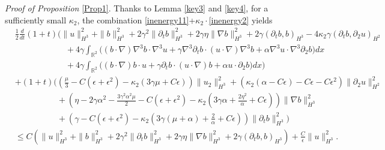 \documentclass[reqno,11pt]{amsart}
\def\R{\mathbb R}
\numberwithin{Thm}{section}
\begin{document}
 \textit{Proof of Proposition} \ref{Prop1}. Thanks to Lemma \ref{key3} and \ref{key4}, for a sufficiently small $\kappa_2$, the combination \eqref{inenergy11}+$\kappa_2\cdot$\eqref{inenergy2} yields
\begin{align*}
&\frac{1}{2}\frac{d}{dt}(1+t)\Big(\|u\|^2_{H^3}+\| b\|^2_{H^3}+2\gamma^2\|\partial_tb\|^2_{H^3}
+2\gamma\eta\|\nabla b\|^2_{H^3}+2\gamma(\partial_tb,b)_{H^3}-4\kappa_2\gamma(\partial_tb,\partial_2u)_{H^2}\nonumber\\
&\qquad\quad\qquad\quad+4\gamma\int_{\R^2}\big((b\cdot\nabla)\nabla^3 b\cdot\nabla^3 u+\gamma\nabla^3\partial_{t}b\cdot (u\cdot\nabla)\nabla^3 b+\alpha\nabla^3u\cdot\nabla^3\partial_2 b\big)dx\nonumber\\
&\qquad\quad\qquad\quad+4\gamma\int_{\R^2}\big((b\cdot\nabla) b\cdot u+\gamma\partial_{t}b\cdot (u\cdot\nabla) b+\alpha u\cdot\partial_2 b\big)dx\Big)\nonumber\\
&+(1+t)\big((\frac{\mu}{3}-C(\epsilon+\epsilon^2)-\kappa_2(3\gamma\mu+C\epsilon))\|u_2\|^2_{H^3}+(\kappa_2(\alpha-C\epsilon)-C\epsilon-C\epsilon^2)\|\partial_2u\|_{H^2}^2\nonumber\\
&\qquad\quad\quad\quad +(\eta-2\gamma\alpha^2-\frac{3\gamma^2\alpha^2\mu}{2}-C(\epsilon+\epsilon^2)-\kappa_2(3\gamma\alpha+\frac{2\eta^2}{\alpha}+C\epsilon))\|\nabla b\|^2_{H^3}\nonumber\\
&\qquad\quad\quad\quad+(\gamma-C(\epsilon+\epsilon^2)-\kappa_2(3\gamma(\mu+\alpha)+\frac{2}{\alpha}+C\epsilon))\|\partial_tb\|^2_{H^3}
\big)\nonumber\\&\leq C\left(\|u\|^2_{H^3}+\| b\|^2_{H^3}+2\gamma^2\|\partial_tb\|^2_{H^3}
+2\gamma\eta\|\nabla b\|^2_{H^3}+2\gamma(\partial_t b,b)_{H^3}
\right)+\frac{C}{\epsilon}\|u\|_{H^3}^2.
\end{align*}
\end{document}
